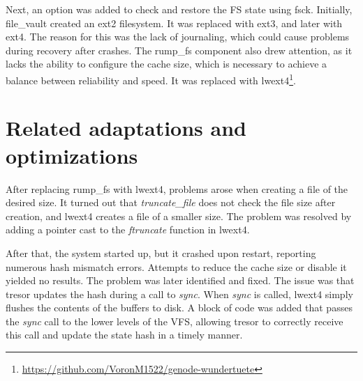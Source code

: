 Next, an option was added to check and restore the FS state using fsck. Initially, file\_vault created an ext2 filesystem. It was replaced with ext3, and later with ext4. The reason for this was the lack of journaling, which could cause problems during recovery after crashes. The rump\_fs component also drew attention, as it lacks the ability to configure the cache size, which is necessary to achieve a balance between reliability and speed. It was replaced with lwext4\footnote{\url{https://github.com/VoronM1522/genode-wundertuete}}.

\section{Related adaptations and optimizations}

After replacing rump\_fs with lwext4, problems arose when creating a file of the desired size. It turned out that \textit{truncate\_file} does not check the file size after creation, and lwext4 creates a file of a smaller size. The problem was resolved by adding a pointer cast to the \textit{ftruncate} function in lwext4.

After that, the system started up, but it crashed upon restart, reporting numerous hash mismatch errors. Attempts to reduce the cache size or disable it yielded no results. The problem was later identified and fixed. The issue was that tresor updates the hash during a call to \textit{sync}. When \textit{sync} is called, lwext4 simply flushes the contents of the buffers to disk. A block of code was added that passes the \textit{sync} call to the lower levels of the VFS, allowing tresor to correctly receive this call and update the state hash in a timely manner.

